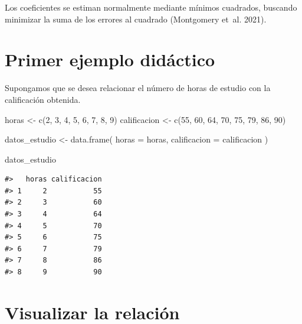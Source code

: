 \documentclass[
  spanish,
  10.5pt,
  letterpaper,
  openany,
  headings=big]{scrbook}
\newenvironment{Shaded}{}{}
\newcommand{\AttributeTok}[1]{\textcolor[rgb]{0.84,0.23,0.29}{#1}}
\newcommand{\DecValTok}[1]{\textcolor[rgb]{0.00,0.36,0.77}{#1}}
\newcommand{\FunctionTok}[1]{\textcolor[rgb]{0.44,0.26,0.76}{#1}}
\newcommand{\NormalTok}[1]{\textcolor[rgb]{0.14,0.16,0.18}{#1}}
\newcommand{\OtherTok}[1]{\textcolor[rgb]{0.44,0.26,0.76}{#1}}
\begin{document}
Los coeficientes se estiman normalmente mediante mínimos cuadrados,
buscando minimizar la suma de los errores al cuadrado (Montgomery et~al.
2021).

\section{Primer ejemplo didáctico}\label{primer-ejemplo-diduxe1ctico}

Supongamos que se desea relacionar el número de horas de estudio con la
calificación obtenida.

\begin{Shaded}
\begin{Highlighting}[]
\NormalTok{horas }\OtherTok{\textless{}{-}} \FunctionTok{c}\NormalTok{(}\DecValTok{2}\NormalTok{, }\DecValTok{3}\NormalTok{, }\DecValTok{4}\NormalTok{, }\DecValTok{5}\NormalTok{, }\DecValTok{6}\NormalTok{, }\DecValTok{7}\NormalTok{, }\DecValTok{8}\NormalTok{, }\DecValTok{9}\NormalTok{)}
\NormalTok{calificacion }\OtherTok{\textless{}{-}} \FunctionTok{c}\NormalTok{(}\DecValTok{55}\NormalTok{, }\DecValTok{60}\NormalTok{, }\DecValTok{64}\NormalTok{, }\DecValTok{70}\NormalTok{, }\DecValTok{75}\NormalTok{, }\DecValTok{79}\NormalTok{, }\DecValTok{86}\NormalTok{, }\DecValTok{90}\NormalTok{)}

\NormalTok{datos\_estudio }\OtherTok{\textless{}{-}} \FunctionTok{data.frame}\NormalTok{(}
  \AttributeTok{horas =}\NormalTok{ horas,}
  \AttributeTok{calificacion =}\NormalTok{ calificacion}
\NormalTok{)}

\NormalTok{datos\_estudio}
\end{Highlighting}
\end{Shaded}

\begin{verbatim}
#>   horas calificacion
#> 1     2           55
#> 2     3           60
#> 3     4           64
#> 4     5           70
#> 5     6           75
#> 6     7           79
#> 7     8           86
#> 8     9           90
\end{verbatim}

\section{Visualizar la relación}\label{visualizar-la-relaciuxf3n}
\end{document}
